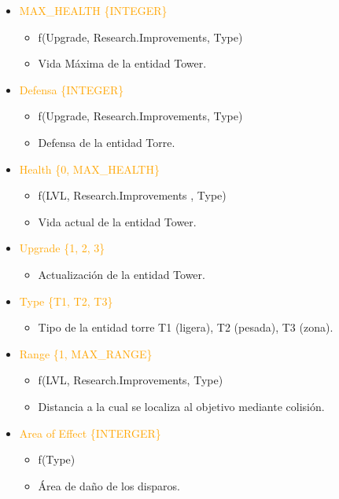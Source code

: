 \documentclass{article}
\begin{document}
\begin{itemize}
    \item \textcolor{Orange}{MAX\_HEALTH \{INTEGER\}}
    \begin{itemize}
        \item f(Upgrade, Research.Improvements, Type)
        \item Vida Máxima de la entidad Tower.
    \end{itemize}
    \item \textcolor{Orange}{Defensa \{INTEGER\}}
    \begin{itemize}
        \item f(Upgrade, Research.Improvements, Type)
        \item Defensa de la entidad Torre.
    \end{itemize}
    \item \textcolor{Orange}{Health \{0, MAX\_HEALTH\}}
    \begin{itemize}
        \item f(LVL, Research.Improvements , Type)
        \item Vida actual de la entidad Tower.
    \end{itemize}
    \item \textcolor{Orange}{Upgrade \{1, 2, 3\}}
    \begin{itemize}
        \item Actualización de la entidad Tower.
    \end{itemize}
    \item \textcolor{Orange}{Type \{T1, T2, T3\}}
    \begin{itemize}
        \item Tipo de la entidad torre T1 (ligera), T2 (pesada), T3 (zona).
    \end{itemize}
    \item \textcolor{Orange}{Range \{1, MAX\_RANGE\}}
    \begin{itemize}
        \item f(LVL, Research.Improvements, Type)
        \item Distancia a la cual se localiza al objetivo mediante colisión.
    \end{itemize}
    \item \textcolor{Orange}{Area of Effect \{INTERGER\}}
    \begin{itemize}
        \item f(Type)
        \item Área de daño de los disparos.
    \end{itemize}

\end{itemize}
\end{document}

